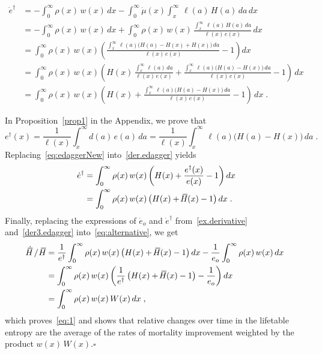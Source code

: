 \documentclass[a4paper,twoside, openright, 12pt, leqno]{article}
\newcommand*\xbar[1]{%
   \hbox{%
     \vbox{%
       \hrule height 0.5pt %
       \kern0.3ex%
       \hbox{%
         \kern-0.28em%
         \ensuremath{#1}%
         \kern-0.05em%
       }%
     }%
   }%
}
\begin{document}
\begin{equation}
 \begin{split}
 \dot{e}^\dagger	
    & = -\int_0^\infty\rho(x)\,w(x)\,dx-\int_0^\infty\dot{\mu}(x)\int_x^\infty\,\ell(a)\,H(a)\,da\,dx    \\
    & = -\int_0^\infty\rho(x)\,w(x)\,dx+\int_0^\infty\rho(x)\,w(x)\,\frac{\int_x^\infty\,\ell(a)\,H(a)\,da}{\ell(x)\,e(x)}\,dx                                   \\
    & =\int_0^\infty\rho(x)\,w(x)\left(\frac{\int_x^\infty\,\ell(a)\big(H(a)-H(x)+H(x)\big)\,da}{\ell(x)\,e(x)}-1\right)dx                  \\
    & =\int_0^\infty\rho(x)\,w(x)\left(H(x)\,\frac{\int_x^\infty\,\ell(a)\,da}{\ell(x)\,e(x)}+\frac{\int_x^\infty\,\ell(a)\big(H(a)-H(x)\big)\,da}{\ell(x)\,e(x)}-1\right)\,dx                                           \\
    & =\int_0^\infty\rho(x)\,w(x)\left(H(x)+\frac{\int_x^\infty\,\ell(a)\big(H(a)-H(x)\big)\,da}{\ell(x)\,e(x)}-1\right)\,dx\;.
 \label{der.edagger}
 \end{split}
\end{equation}

In Proposition~\ref{prop1} in the Appendix, we prove that
%
\begin{equation}
e^\dagger(x)=\frac{1}{\ell(x)}\int_x^\infty d(a)\,e(a)\,da=\frac{1}{\ell(x)}\int_x^\infty\,\ell(a)\big(H(a)-H(x)\big)\,da\;.
\label{eq:edaggerNew}
\end{equation}
%
Replacing~\eqref{eq:edaggerNew} into~\eqref{der.edagger} yields
%
\begin{equation}
  \begin{split}
    \dot{e}^\dagger
        & = \int_0^\infty\rho(x)\,w(x)\left(H(x)+\frac{e^\dagger(x)}{e(x)}-1\right)dx                 \\
        & = \int_0^\infty\rho(x)\,w(x)\,\big(H(x)+\,\xbar{H}(x)-1\big)\,dx   \;.
  \end{split}
  \label{der3.edagger}
\end{equation}
%
Finally, replacing the expressions of $\dot{e}_o$ and $\dot{e}^\dagger$ from~\eqref{ex.derivative} and~\eqref{der3.edagger} into~\eqref{eq:alternative}, we get 
%
\begin{equation*}
 \begin{split}
    \dot{\xbar{H}}\,/\,\,\xbar{H}
        & = \frac{1}{e^\dagger}\int_0^\infty\rho(x)\,w(x)\left(H(x)+\,\xbar{H}(x)-1\right)dx-\frac{1}{e_o}\int_0^\infty\rho(x)\,w(x)\,dx    \\
        & = \int_0^\infty\rho(x)\,w(x)\left(\frac{1}{e^\dagger}\left(H(x)+\,\xbar{H}(x)-1\right)-\frac{1}{e_o}\right)dx                               \\
        & = \int_0^\infty\rho(x)\,w(x)\,W(x)\,dx\;,
 \end{split}
\end{equation*}
%
which proves~\eqref{eq:1} and shows that relative changes over time in the lifetable entropy are the average of the rates of mortality improvement weighted by the product $w(x)\,W(x)$.\hfill$\square$
\end{document}
